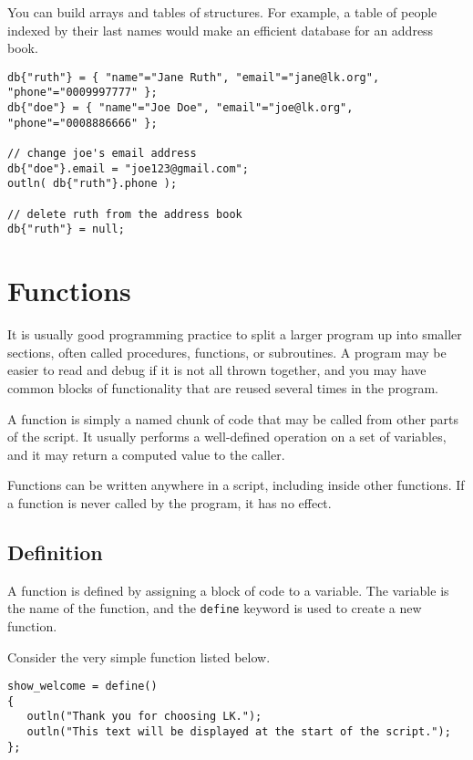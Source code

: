 \documentclass{article}
\begin{document}
You can build arrays and tables of structures.  For example, a table of people indexed by their last names would make an efficient database for an address book.

\begin{verbatim}
db{"ruth"} = { "name"="Jane Ruth", "email"="jane@lk.org", "phone"="0009997777" };
db{"doe"} = { "name"="Joe Doe", "email"="joe@lk.org", "phone"="0008886666" };

// change joe's email address
db{"doe"}.email = "joe123@gmail.com";
outln( db{"ruth"}.phone );

// delete ruth from the address book
db{"ruth"} = null;

\end{verbatim}

\section{Functions}

It is usually good programming practice to split a larger program up into smaller sections, often called procedures, functions, or subroutines.  A program may be easier to read and debug if it is not all thrown together, and you may have common blocks of functionality that are reused several times in the program.

A function is simply a named chunk of code that may be called from other parts of the script.  It usually performs a well-defined operation on a set of variables, and it may return a computed value to the caller.

Functions can be written anywhere in a script, including inside other functions.  If a function is never called by the program, it has no effect.

\subsection{Definition}

A function is defined by assigning a block of code to a variable.  The variable is the name of the function, and the \texttt{define} keyword is used to create a new function.

Consider the very simple function listed below.

\begin{verbatim}
show_welcome = define()
{
   outln("Thank you for choosing LK.");
   outln("This text will be displayed at the start of the script.");
};
\end{verbatim}
\end{document}
